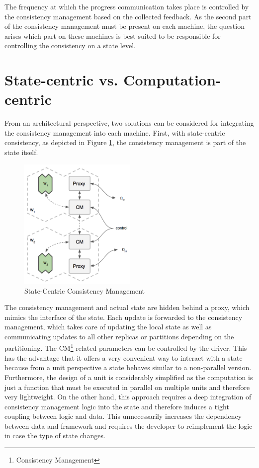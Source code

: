 The frequency at which the progress communication takes place is controlled by the consistency management based on the collected feedback.
As the second part of the consistency management must be present on each machine, the question arises which part on these machines is best suited to be responsible for controlling the consistency on a state level.

\section{State-centric vs. Computation-centric}
From an architectural perspective, two solutions can be considered for integrating the consistency management into each machine.
First, with state-centric consistency, as depicted in Figure \ref{fig:state_centric_consistency}, the consistency management is part of the state itself.
\begin{figure}[ht]
\centering
\includegraphics[width=0.5\textwidth]{img/state_centric_consist.png}
\caption{State-Centric Consistency Management}
\label{fig:state_centric_consistency}
\end{figure}
The consistency management and actual state are hidden behind a proxy, which mimics the interface of the state.
Each update is forwarded to the consistency management, which takes care of updating the local state as well as communicating updates to all other replicas or partitions depending on the partitioning.
The CM\footnote{Consistency Management} related parameters can be controlled by the driver.
This has the advantage that it offers a very convenient way to interact with a state because from a unit perspective a state behaves similar to a non-parallel version.
Furthermore, the design of a unit is considerably simplified as the computation is just a function that must be executed in parallel on multiple units and therefore very lightweight.
On the other hand, this approach requires a deep integration of consistency management logic into the state and therefore induces a tight coupling between logic and data.
This unnecessarily increases the dependency between data and framework and requires the developer to reimplement the logic in case the type of state changes.

